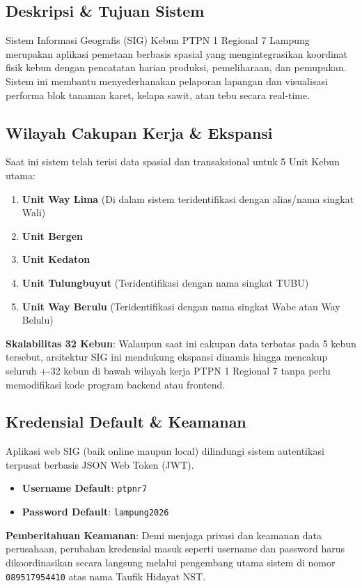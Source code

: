 \documentclass[12pt, a4paper]{article}
\begin{document}
\subsection{Deskripsi \& Tujuan Sistem}
Sistem Informasi Geografis (SIG) Kebun PTPN 1 Regional 7 Lampung merupakan aplikasi pemetaan berbasis spasial yang mengintegrasikan koordinat fisik kebun dengan pencatatan harian produksi, pemeliharaan, dan pemupukan. Sistem ini membantu menyederhanakan pelaporan lapangan dan visualisasi performa blok tanaman karet, kelapa sawit, atau tebu secara real-time.

\subsection{Wilayah Cakupan Kerja \& Ekspansi}
Saat ini sistem telah terisi data spasial dan transaksional untuk 5 Unit Kebun utama:
\begin{enumerate}
    \item \textbf{Unit Way Lima} (Di dalam sistem teridentifikasi dengan alias/nama singkat Wali)
    \item \textbf{Unit Bergen}
    \item \textbf{Unit Kedaton}
    \item \textbf{Unit Tulungbuyut} (Teridentifikasi dengan nama singkat TUBU)
    \item \textbf{Unit Way Berulu} (Teridentifikasi dengan nama singkat Wabe atau Way Belulu)
\end{enumerate}

\textbf{Skalabilitas 32 Kebun}: Walaupun saat ini cakupan data terbatas pada 5 kebun tersebut, arsitektur SIG ini mendukung ekspansi dinamis hingga mencakup seluruh +-32 kebun di bawah wilayah kerja PTPN 1 Regional 7 tanpa perlu memodifikasi kode program backend atau frontend.

\subsection{Kredensial Default \& Keamanan}
Aplikasi web SIG (baik online maupun local) dilindungi sistem autentikasi terpusat berbasis JSON Web Token (JWT).
\begin{itemize}
    \item \textbf{Username Default}: \texttt{ptpnr7}
    \item \textbf{Password Default}: \texttt{lampung2026}
\end{itemize}

\textbf{Pemberitahuan Keamanan}: Demi menjaga privasi dan keamanan data perusahaan, perubahan kredensial masuk seperti username dan password harus dikoordinasikan secara langsung melalui pengembang utama sistem di nomor \texttt{089517954410} atas nama Taufik Hidayat NST.
\end{document}
